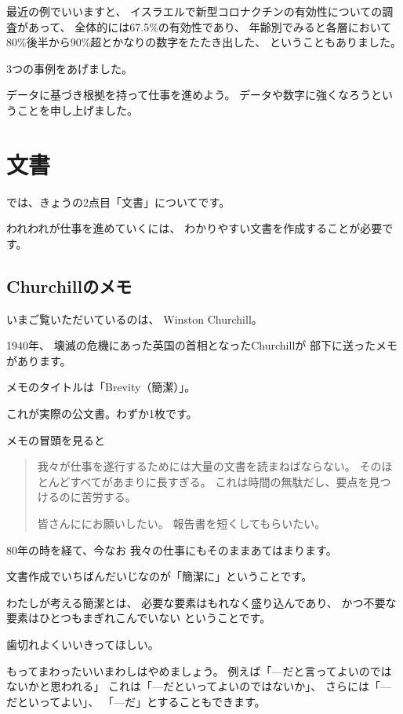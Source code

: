 \documentclass[uplatex,jis2004,dvipdfmx,12pt]{jsarticle}
\begin{document}
最近の例でいいますと、
イスラエルで新型コロナクチンの有効性についての調査があって、
全体的には67.5\%の有効性であり、
年齢別でみると各層において80\%後半から90\%超とかなりの数字をたたき出した、
ということもありました。


3つの事例をあげました。

データに基づき根拠を持って仕事を進めよう。
データや数字に強くなろうということを申し上げました。


\section{文書}

では、きょうの2点目「文書」についてです。

われわれが仕事を進めていくには、
わかりやすい文書を作成することが必要です。

\subsection{Churchillのメモ}

いまご覧いただいているのは、
Winston Churchill。

1940年、
壊滅の危機にあった英国の首相となったChurchillが
部下に送ったメモがあります。

メモのタイトルは「Brevity（簡潔）」。

これが実際の公文書。わずか1枚です。

メモの冒頭を見ると

\begin{quote}
我々が仕事を遂行するためには大量の文書を読まねばならない。
そのほとんどすべてがあまりに長すぎる。
これは時間の無駄だし、要点を見つけるのに苦労する。

皆さんににお願いしたい。
報告書を短くしてもらいたい。
\end{quote}



80年の時を経て、今なお
我々の仕事にもそのままあてはまります。

文書作成でいちばんだいじなのが「簡潔に」ということです。

わたしが考える簡潔とは、
必要な要素はもれなく盛り込んであり、
かつ不要な要素はひとつもまぎれこんでいない
ということです。

歯切れよくいいきってほしい。



もってまわったいいまわしはやめましょう。
例えば「---だと言ってよいのではないかと思われる」
これは「---だといってよいのではないか」、
さらには「---だといってよい」、
「---だ」とすることもできます。
\end{document}
